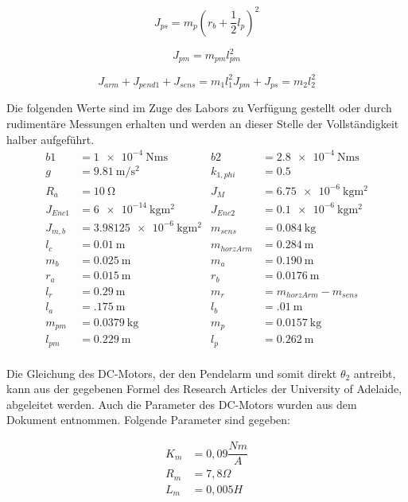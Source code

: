 \begin{equation}
J_{ps}=m_p(r_b+\frac{1}{2}l_p)^2
\end{equation}

\begin{equation}
J_{pm}=m_{pm}l^2_{pm}
\end{equation}

\begin{equation}
J_{arm}+J_{pend1}+J_{sens}=m_1l^2_1J_{pm}+J_{ps}=m_2l^2_2
\end{equation}

Die folgenden Werte sind im Zuge des Labors zu Verfügung gestellt oder durch rudimentäre Messungen erhalten und werden an dieser Stelle der Vollständigkeit halber aufgeführt. 
\begin{align*}
b1 &= \SI{1e-4}{\newton\metre\second} &
b2 &= \SI{2.8e-4}{\newton\metre\second} \\
g &= \SI{9.81}{\metre\per\square\second} &
k_{1,phi} &= \SI{0.5}{}\\
R_a &= \SI{10}{\ohm} &
J_M  &=  \SI{6.75e-6}{\kilo\gram\square\metre}  \\        %
J_{Enc1}  &=  \SI{6e-14}{\kilo\gram\square\metre}  &        %
J_{Enc2}  &=  \SI{0.1e-6}{\kilo\gram\square\metre}  \\     %
J_{m,b}  &=  \SI{3.98125e-6}{\kilo\gram\square\metre}  &     %
m_{sens}  &=  \SI{0.084}{\kilo\gram}  \\
l_c  &=  \SI{0.01}{\metre}  &
m_{horzArm} &= \SI{0.284}{\metre} \\
m_b &= \SI{0.025}{\metre}  &
m_a &= \SI{0.190}{\metre} \\
r_a &= \SI{0.015}{\metre}  &
r_b &= \SI{0.0176}{\metre} \\
l_r &= \SI{0.29}{\metre} &
m_r  &=  m_{horzArm} - m_{sens}\\
l_a &= \SI{.175}{\metre} &
l_b &= \SI{.01}{\metre}\\
m_{pm} &= \SI{0.0379}{\kilo\gram} &
m_p &= \SI{0.0157}{\kilo\gram}\\
l_{pm} &= \SI{0.229}{\metre} &
l_p &= \SI{0.262}{\metre}\\
\end{align*}


Die Gleichung des DC-Motors, der den Pendelarm und somit direkt $\theta_2$ antreibt, kann aus der gegebenen Formel des Research Articles der University of Adelaide, abgeleitet werden.\cite{Cazzolato.2011}
Auch die Parameter des DC-Motors wurden aus dem Dokument entnommen. Folgende Parameter sind gegeben:

\begin{align}
K_m &= 0,09  \dfrac{Nm}{A} \\
R_m &= 7,8  \Omega \\
L_m &= 0,005  H \\
\end{align}